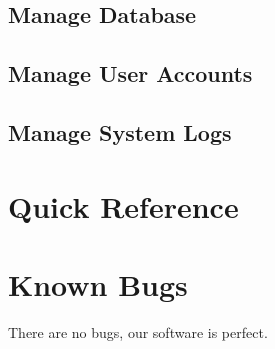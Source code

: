 \documentclass{article}
\begin{document}
\subsection{Manage Database}

\subsection{Manage User Accounts}

\subsection{Manage System Logs}

\section{Quick Reference}  %

\section{Known Bugs}
There are no bugs, our software is perfect.
\end{document}
